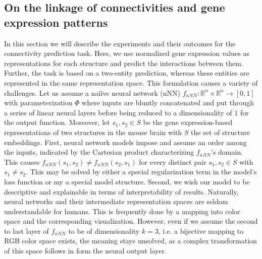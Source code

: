 \documentclass[]{article}
\begin{document}
\subsection{On the linkage of connectivities and gene expression patterns}
\label{sec:results_connpred}
In this section we will describe the experiments and their outcomes for the connectivity prediction task. Here, we use normalized gene expression values as representations for each structure and predict the interactions between them. Further, the task is based on a two-entity prediction, whereas these entities are represented in the same representation space. 
This formulation causes a variety of challenges. Let us assume a nai\"ive neural network (nNN) $f_{nNN}:\mathbb{R}^n\times \mathbb{R}^n\rightarrow [0,1]$ with parameterization $\Phi$ where inputs are bluntly concatenated and put through a series of linear neural layers before being reduced to a dimensionality of $1$ for the output function. Moreover, let $s_1, s_2\in S$ be the gene expression-based representations of two structures in the mouse brain with $S$ the set of structure embeddings.
First, neural network models impose and assume an order among the inputs, indicated by the Cartesian product characterizing $f_{nNN}$'s domain. This causes $f_{nNN}(s_1, s_2)\neq f_{nNN}(s_2, s_1)$ for every distinct pair $s_1,s_2\in S$ with $s_1\neq s_2$. This may be solved by either a special regularization term in the model's loss function or my a special model structure. 
Second, we wish our model to be descriptive and explainable in terms of interpretability of results. Naturally, neural networks and their intermediate representation spaces are seldom understandable for humans. This is frequently done by a mapping into color space and the corresponding visualization. However, even if we assume the second to last layer of $f_{nNN}$ to be of dimensionality $k=3$, i.e. a bijective mapping to RGB color space exists, the meaning stays unsolved, as a complex transformation of this space follows in form the neural output layer.\\
\end{document}
